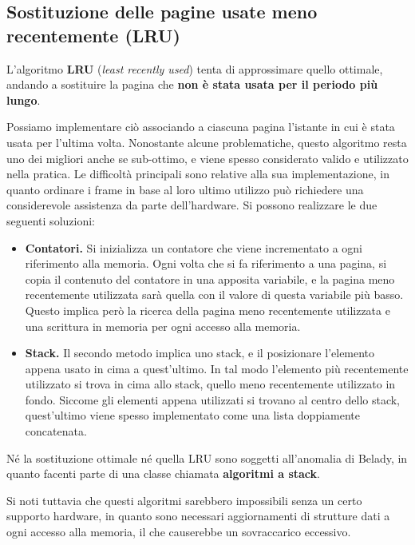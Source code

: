     \subsection{Sostituzione delle pagine usate meno recentemente (LRU)}
        L'algoritmo \textbf{LRU} (\textit{least recently used}) tenta di approssimare quello ottimale, andando a sostituire la pagina che \textbf{non è stata usata per il periodo più lungo}.
        
        Possiamo implementare ciò associando a ciascuna pagina l'istante in cui è stata usata per l'ultima volta. Nonostante alcune problematiche, questo algoritmo resta uno dei migliori anche se sub-ottimo, e viene spesso considerato valido e utilizzato nella pratica. Le difficoltà principali sono relative alla sua implementazione, in quanto ordinare i frame in base al loro ultimo utilizzo può richiedere una considerevole assistenza da parte dell'hardware. Si possono realizzare le due seguenti soluzioni:
        \begin{itemize}
            \item \textbf{Contatori.} Si inizializza un contatore che viene incrementato a ogni riferimento alla memoria. Ogni volta che si fa riferimento a una pagina, si copia il contenuto del contatore in una apposita variabile, e la pagina meno recentemente utilizzata sarà quella con il valore di questa variabile più basso. Questo implica però la ricerca della pagina meno recentemente utilizzata e una scrittura in memoria per ogni accesso alla memoria.
            
            \item \textbf{Stack.} Il secondo metodo implica uno stack, e il posizionare l'elemento appena usato in cima a quest'ultimo. In tal modo l'elemento più recentemente utilizzato si trova in cima allo stack, quello meno recentemente utilizzato in fondo. Siccome gli elementi appena utilizzati si trovano al centro dello stack, quest'ultimo viene spesso implementato come una lista doppiamente concatenata.
        \end{itemize}
        
        Né la sostituzione ottimale né quella LRU sono soggetti all'anomalia di Belady, in quanto facenti parte di una classe chiamata \textbf{algoritmi a stack}.
        
        Si noti tuttavia che questi algoritmi sarebbero impossibili senza un certo supporto hardware, in quanto sono necessari aggiornamenti di strutture dati a ogni accesso alla memoria, il che causerebbe un sovraccarico eccessivo.
        
